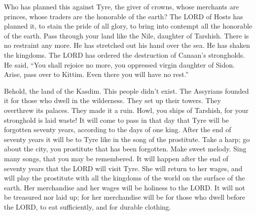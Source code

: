 \myverse{}Who has planned this against Tyre, the giver of crowns, whose
merchants are princes, whose traders are the honorable of the earth?
\myverse{}The LORD of Hosts has planned it, to stain the pride of all glory, to bring
into contempt all the honorable of the earth.
\myverse{}Pass through your land like the Nile, daughter of Tarshish. There is no restraint
any more.
\myverse{}He has stretched out his hand over the sea. He has shaken the kingdoms. The
LORD has ordered the destruction of Canaan’s strongholds.
\myverse{}He said, “You shall rejoice no more, you oppressed virgin daughter of Sidon.
Arise, pass over to Kittim. Even there you will have no rest.”

\myverse{}Behold, the land of the Kasdim. This people didn’t exist. The
Assyrians founded it for those who dwell in the wilderness. They set up their towers. They overthrew its
palaces. They made it a ruin.
\myverse{}Howl, you ships of Tarshish, for your stronghold is laid waste!
\myverse{}It will come to pass in that day that Tyre will be forgotten seventy years,
according to the days of one king. After the end of seventy years it will be to Tyre like in the song
of the prostitute.
\myverse{}Take a harp; go about the city, you prostitute that has been forgotten. Make
sweet melody. Sing many songs, that you may be remembered.
\myverse{}It will happen after the end of seventy years that the LORD will visit Tyre.
She will return to her wages, and will play the prostitute with all the kingdoms of the world on the surface
of the earth.
\myverse{}Her merchandise and her wages will be holiness to the LORD. It will not be
treasured nor laid up; for her merchandise will be for those who dwell before the LORD, to eat sufficiently,
and for durable clothing.



